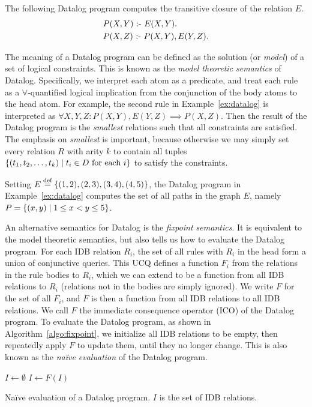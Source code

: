 \begin{ex}
\label{ex:datalog}
The following Datalog program computes the transitive closure of the relation $E$. 
\begin{align*}
  &P(X, Y) \text{ :- } E(X, Y).\\
  &P(X, Z) \text{ :- } P(X, Y), E(Y, Z).
\end{align*}
\end{ex}

The meaning of a Datalog program can be defined as the solution (or {\em model}) of 
 a set of logical constraints.
This is known as the {\em model theoretic semantics} of Datalog.
Specifically, we interpret each atom as a predicate,
 and treat each rule as a $\forall$-quantified logical implication
 from the conjunction of the body atoms to the head atom.
For example, the second rule in Example~\ref{ex:datalog} 
 is interpreted as $\forall X, Y, Z : P(X, Y), E(Y, Z) \implies P(X, Z)$.
Then the result of the Datalog program is the {\em smallest} relations 
 such that all constraints are satisfied.
The emphasis on {\em smallest} is important, 
 because otherwise we may simply set every relation $R$ with arity $k$ 
 to contain all tuples $\{{(t_1, t_2, \ldots, t_k)}\mid{t_i \in D \text{ for each } i}\}$
 to satisfy the constraints.

\begin{ex}
\label{ex:tc}
Setting $E \stackrel{\text{def}}{=} \{(1, 2), (2, 3), (3, 4), (4, 5)\}$,
 the Datalog program in Example~\ref{ex:datalog}
 computes the set of all paths in the graph $E$, 
 namely $P = \{{(x, y)}\mid{1 \leq x < y \leq 5}\}$. 
\end{ex}

An alternative semantics for Datalog is the {\em fixpoint semantics}.
It is equivalent to the model theoretic semantics,
 but also tells us how to evaluate the Datalog program.
For each IDB relation $R_i$, the set of all rules with $R_i$ in the head 
 form a union of conjunctive queries.
This UCQ defines a function $F_i$ from the relations in the rule bodies to $R_i$,
 which we can extend to be a function from all IDB relations to $R_i$ 
 (relations not in the bodies are simply ignored). 
We write $F$ for the set of all $F_i$, 
 and $F$ is then a function from all IDB relations to all IDB relations.
We call $F$ the immediate consequence operator (ICO) of the Datalog program.
To evaluate the Datalog program, as shown in Algorithm~\ref{algo:fixpoint},
 we initialize all IDB relations to be empty,
 then repeatedly apply $F$ to update them, 
 until they no longer change.
This is also known as the {\em na\"ive evaluation} of the Datalog program.
\begin{algorithm}
$I \gets \emptyset$\;
{
    $I \gets F(I)$\;
}
\caption{Na\"ive evaluation of a Datalog program. $I$ is the set of IDB relations.}
\label{algo:fixpoint}
\end{algorithm}

